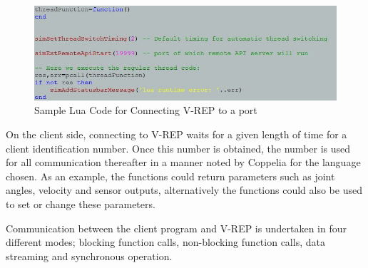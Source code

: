 \documentclass[12pt,openany,a4paper]{book}
\begin{document}
\begin{center}
\begin{figure}[htb]
  \includegraphics[width=\linewidth]{vrep_port_listen.jpg}
\caption{Sample Lua Code for Connecting V-REP to a port}
\end{figure}
\end{center}
On the client side, connecting to V-REP waits for a given length of time for a client identification number. Once this number is obtained, the number is used for all communication thereafter in a manner noted by Coppelia for the language chosen. As an example, the functions could return parameters such as joint angles, velocity and sensor outputs, alternatively the functions could also be used to set or change these parameters.

Communication between the client program and V-REP is undertaken in four different modes; blocking function calls, non-blocking function calls, data streaming and synchronous operation.
\end{document}
